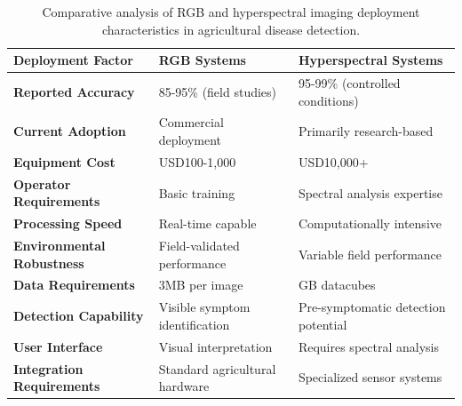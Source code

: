 \documentclass[sn-mathphys]{sn-jnl}
\theoremstyle{thmstyleone}%
\theoremstyle{thmstyletwo}%
\theoremstyle{thmstylethree}%
\begin{document}
\begin{table}[h!]
\centering
\small
\caption{Comparative analysis of RGB and hyperspectral imaging deployment characteristics in agricultural disease detection.}
\label{tab:hsivsrgb}
\begin{tabular}{p{3.5cm}p{4cm}p{4cm}}
\hline
\textbf{Deployment Factor} & \textbf{RGB Systems} & \textbf{Hyperspectral Systems} \\
\hline \hline
\textbf{Reported Accuracy} & 85-95\% (field studies) \citep{bendig2014,sanches2018} & 95-99\% (controlled conditions) \citep{lu2020recent,ram2024systematic} \\ 
\hline
\textbf{Current Adoption} & Commercial deployment \citep{gano2024,fu2020} & Primarily research-based \citep{lu2020recent,ram2024systematic} \\ 
\hline
\textbf{Equipment Cost} & USD100-1,000 \citep{dichter2020,spanos2023} & USD10,000+ \citep{lu2020recent,imec2024,dichter2020} \\ 
\hline
\textbf{Operator Requirements} & Basic training \citep{livingoptics2024} & Spectral analysis expertise \citep{lu2020recent} \\ 
\hline
\textbf{Processing Speed} & Real-time capable \citep{gano2024} & Computationally intensive \citep{lu2020recent,imec2024} \\ 
\hline
\textbf{Environmental Robustness} & Field-validated performance \citep{gene2020assessing} & Variable field performance \citep{lu2020recent,ram2024systematic} \\ 
\hline
\textbf{Data Requirements} & 3MB per image \citep{gano2024} & GB datacubes \citep{lu2020recent,ram2024systematic} \\ 
\hline
\textbf{Detection Capability} & Visible symptom identification \citep{livingoptics2024} & Pre-symptomatic detection potential \citep{lu2020recent} \\ 
\hline
\textbf{User Interface} & Visual interpretation \citep{gano2024} & Requires spectral analysis \citep{ram2024systematic,lu2020recent} \\ 
\hline
\textbf{Integration Requirements} & Standard agricultural hardware \citep{fu2020} & Specialized sensor systems \citep{imec2024,lu2020recent} \\
\hline
\end{tabular}
\end{table}
\end{document}
